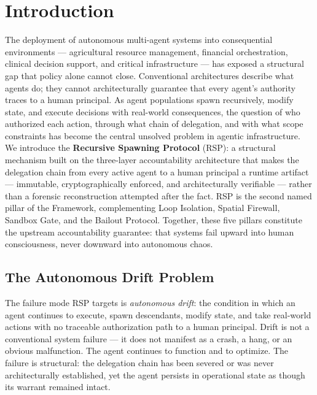 \section{Introduction}
\label{sec:rs-intro}

The deployment of autonomous multi-agent systems into consequential environments — agricultural resource management, financial orchestration, clinical decision support, and critical infrastructure — has exposed a structural gap that policy alone cannot close. Conventional architectures describe what agents do; they cannot architecturally guarantee that every agent's authority traces to a human principal. As agent populations spawn recursively, modify state, and execute decisions with real-world consequences, the question of who authorized each action, through what chain of delegation, and with what scope constraints has become the central unsolved problem in agentic infrastructure. We introduce the \textbf{Recursive Spawning Protocol} (RSP): a structural mechanism built on the \bxthree{} three-layer accountability architecture that makes the delegation chain from every active agent to a human principal a runtime artifact — immutable, cryptographically enforced, and architecturally verifiable — rather than a forensic reconstruction attempted after the fact. RSP is the second named pillar of the \bxthree{} Framework, complementing Loop Isolation, Spatial Firewall, Sandbox Gate, and the Bailout Protocol. Together, these five pillars constitute the upstream accountability guarantee: that \bxthree{} systems fail upward into human consciousness, never downward into autonomous chaos.

\subsection{The Autonomous Drift Problem}

The failure mode RSP targets is \emph{autonomous drift}: the condition in which an agent continues to execute, spawn descendants, modify state, and take real-world actions with no traceable authorization path to a human principal. Drift is not a conventional system failure — it does not manifest as a crash, a hang, or an obvious malfunction. The agent continues to function and to optimize. The failure is structural: the delegation chain has been severed or was never architecturally established, yet the agent persists in operational state as though its warrant remained intact.

